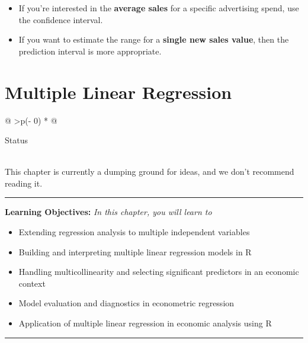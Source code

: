 \documentclass[
  letterpaper,
  paper =a4,
  twoside,
  openright,
  headsepline,
  footsepline,
  listof = totocnumbered,
  chapterprefix = true,
  firstiscover,
  parskip = full*]{scrbook}
\providecommand{\abstractname}{Learning Objectives} %
\newenvironment{objectives}[1]{%
	\hrule
	\vspace{5pt}
	\small\textbf{\abstractname: } 
	\newline
	\vspace{0.1cm}
	\small\emph{#1} %
	\itshape %
}{%
	\vspace{5pt}
	\hrule
	\vspace{0.6cm}
}
\begin{document}
\begin{itemize}
\item
  If you're interested in the \textbf{average sales} for a specific
  advertising spend, use the confidence interval.
\item
  If you want to estimate the range for a \textbf{single new sales
  value}, then the prediction interval is more appropriate.
\end{itemize}


\chapter{Multiple Linear Regression}\label{multiple-linear-regression}

\begin{longtable}[]{@{}
  >{\centering\arraybackslash}p{(\columnwidth - 0\tabcolsep) * }@{}}
\toprule\noalign{}
\begin{minipage}[b]{\linewidth}\centering
Status
\end{minipage} \\
\midrule\noalign{}
\endhead
\bottomrule\noalign{}
\endlastfoot
This chapter is currently a dumping ground for ideas, and we don't
recommend reading it. \\
\end{longtable}

\begin{objectives}{In this chapter, you will learn to}
\begin{itemize}

\item{Extending regression analysis to multiple independent variables}

\item{Building and interpreting multiple linear regression models in R}

\item{Handling multicollinearity and selecting significant predictors in an economic context}

\item{Model evaluation and diagnostics in econometric regression}

\item{Application of multiple linear regression in economic analysis using R}

\end{itemize}

\end{objectives}
\end{document}

